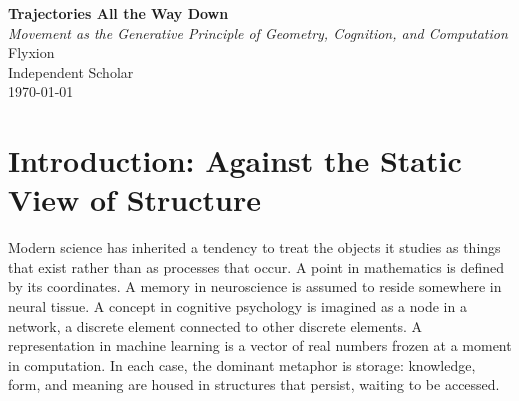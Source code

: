\documentclass[11pt, a4paper]{article}
\theoremstyle{plain}
\theoremstyle{definition}
\theoremstyle{remark}
\begin{document}
\begin{titlepage}
\centering
\vspace*{2cm}
{\LARGE\bfseries Trajectories All the Way Down}\\[0.8em]
{\large\itshape Movement as the Generative Principle of Geometry, Cognition, and Computation}\\[2.5cm]
{\large Flyxion}\\[0.5em]
{\normalsize Independent Scholar}\\[2cm]
{\normalsize\today}\\[3cm]
\begin{abstract}
\noindent This essay advances a single unifying claim: complex structures in mathematics,
neuroscience, cognition, and computation are not static objects stored in systems
but the outcomes of trajectories through spaces generated by simple transformations.
Scaling, rotation, and oscillation function as universal geometric primitives.
When composed into chains of operators, these primitives produce mathematical functions,
neural dynamics, semantic reasoning, and computational representations indistinguishable
in their underlying architecture. The essay traces this principle from classical sweep
geometry and complex analysis through Lie group theory, central pattern generators,
hippocampal navigation, information geometry, and deep learning, arguing that dimension,
thought, and meaning all arise from the same source: movement through representational
space. A philosophical consequence follows. Cognition does not store representations;
it generates them. Knowledge is not retrieved but traversed. The mind is less an archive
than a vehicle, and its objects less locations than roads.
\end{abstract}
\end{titlepage}

\newpage
\tableofcontents
\newpage


\section{Introduction: Against the Static View of Structure}

Modern science has inherited a tendency to treat the objects it studies as things that
exist rather than as processes that occur. A point in mathematics is defined by its
coordinates. A memory in neuroscience is assumed to reside somewhere in neural tissue.
A concept in cognitive psychology is imagined as a node in a network, a discrete element
connected to other discrete elements. A representation in machine learning is a vector
of real numbers frozen at a moment in computation. In each case, the dominant metaphor
is storage: knowledge, form, and meaning are housed in structures that persist, waiting
to be accessed.
\end{document}

